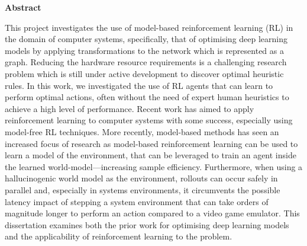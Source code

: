 \newpage
{\Huge \bf Abstract}
\vspace{24pt} 

This project investigates the use of model-based reinforcement learning (RL) in the domain of computer systems, specifically, that of optimising deep learning models by applying transformations to the network which is represented as a graph. Reducing the hardware resource requirements is a challenging research problem which is still under active development to discover optimal heuristic rules. In this work, we investigated the use of RL agents that can learn to perform optimal actions, often without the need of expert human heuristics to achieve a high level of performance. Recent work has aimed to apply reinforcement learning to computer systems with some success, especially using model-free RL techniques. More recently, model-based methods has seen an increased focus of research as model-based reinforcement learning can be used to learn a model of the environment, that can be leveraged to train an agent inside the learned world-model---increasing sample efficiency. Furthermore, when using a hallucinogenic world model as the environment, rollouts can occur safely in parallel and, especially in systems environments, it circumvents the possible latency impact of stepping a system environment that can take orders of magnitude longer to perform an action compared to a video game emulator. This dissertation examines both the prior work for optimising deep learning models and the applicability of reinforcement learning to the problem.

\vspace*{\fill}
